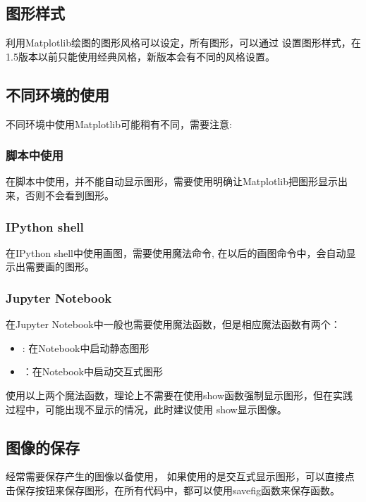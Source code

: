 \documentclass[letterpaper,10pt,english]{sphinxhowto}
\begin{document}
\subsection{图形样式}
\label{\detokenize{matplotlib_u7b80_u4ecb:id1}}
利用Matplotlib绘图的图形风格可以设定，所有图形，可以通过
设置图形样式，在1.5版本以前只能使用经典风格，新版本会有不同的风格设置。


\subsection{不同环境的使用}
\label{\detokenize{matplotlib_u7b80_u4ecb:id2}}
不同环境中使用Matplotlib可能稍有不同，需要注意:


\subsubsection{脚本中使用}
\label{\detokenize{matplotlib_u7b80_u4ecb:id3}}
在脚本中使用，并不能自动显示图形，需要使用明确让Matplotlib把图形显示出来，否则不会看到图形。


\subsubsection{IPython shell}
\label{\detokenize{matplotlib_u7b80_u4ecb:ipython-shell}}
在IPython shell中使用画图，需要使用魔法命令, 在以后的画图命令中，会自动显示出需要画的图形。


\subsubsection{Jupyter Notebook}
\label{\detokenize{matplotlib_u7b80_u4ecb:jupyter-notebook}}
在Jupyter Notebook中一般也需要使用魔法函数，但是相应魔法函数有两个：
\begin{itemize}
\item {} 
: 在Notebook中启动静态图形

\item {} 
：在Notebook中启动交互式图形

\end{itemize}

使用以上两个魔法函数，理论上不需要在使用show函数强制显示图形，但在实践过程中，可能出现不显示的情况，此时建议使用
show显示图像。


\subsection{图像的保存}
\label{\detokenize{matplotlib_u7b80_u4ecb:id4}}
经常需要保存产生的图像以备使用，
如果使用的是交互式显示图形，可以直接点击保存按钮来保存图形，在所有代码中，都可以使用savefig函数来保存函数。
\end{document}

